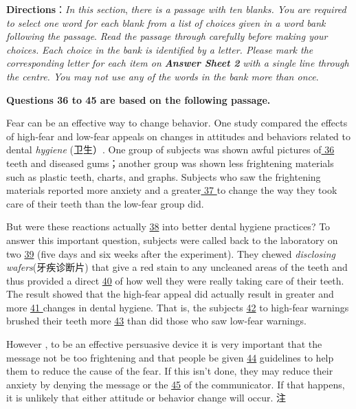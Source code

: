 \documentclass[UTF8,11pt]{ctexart}
\begin{document}
\textbf{Directions}：\textit{In this section},\textit{ there is a passage with ten blanks. You are required to select one word for each blank from a list} \textit{of choices given in a word bank following the passage}.\textit{ Read the passage through carefully before making your choices.} \textit{Each choice in the bank is identified by a letter. Please mark the corresponding letter for each item on}\textbf{\textit{ Answer Sheet 2}} \textit{with a single line through the centre. You may not use any of the words in the bank more than once}.


\textbf{Questions 36 to 45 are based on the following passage.}


Fear can be an effective way to change behavior. One study compared the effects of high-fear and low-fear appeals on changes in attitudes and behaviors related to dental\textit{ hygiene} (卫生）. One group of subjects was shown awful pictures of\uline{ 36 }teeth and diseased gums；another group was shown less frightening materials such as plastic teeth, charts, and graphs. Subjects who saw the frightening materials reported more anxiety and a greater\uline{ 37 }to change the way they took care of their teeth than the low-fear group did.


But were these reactions actually \uline{38} into better dental hygiene practices? To answer this important question, subjects were called back to the laboratory on two \uline{39} (five days and six weeks after the experiment). They chewed\textit{ disclosing wafers}(牙疾诊断片) that give a red stain to any uncleaned areas of the teeth and thus provided a direct \uline{40} of how well they were really taking care of their teeth. The result showed that the high-fear appeal did actually result in greater and more \uline{41 }changes in dental hygiene. That is, the subjects \uline{42} to high-fear warnings brushed their teeth more \uline{43} than did those who saw low-fear warnings.


However , to be an effective persuasive device it is very important that the message not be too frightening and that people be given \uline{44} guidelines to help them to reduce the cause of the fear. If this isn’t done, they may reduce their anxiety by denying the message or the \uline{45} of the communicator. If that happens, it is unlikely that either attitude or behavior change will occur. 注
\end{document}
